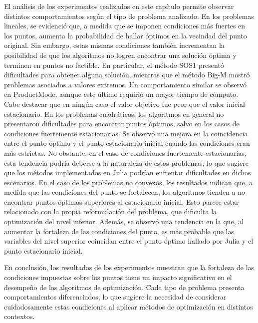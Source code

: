 El análisis de los experimentos realizados en este capítulo permite observar distintos comportamientos según el tipo de problema analizado.
En los problemas lineales, se evidenció que, a medida que se imponen condiciones más fuertes en los puntos, aumenta la probabilidad de hallar óptimos en la vecindad del punto original. 
Sin embargo, estas mismas condiciones también incrementan la posibilidad de que los algoritmos no logren encontrar una solución óptima y terminen en puntos no factible. 
En particular, el método SOS1 presentó dificultades para obtener alguna solución, mientras que el método Big-M mostró problemas asociados a valores extremos. 
Un comportamiento similar se observó en ProductMode, aunque este último requirió un mayor tiempo de cómputo. 
Cabe destacar que en ningún caso el valor objetivo fue peor que el valor inicial estacionario.  
En los problemas cuadráticos, los algoritmos en general no presentaron dificultades para encontrar puntos óptimos, salvo en los casos de condiciones fuertemente estacionarias. 
Se observó una mejora en la coincidencia entre el punto óptimo y el punto estacionario inicial cuando las condiciones eran más estrictas. 
No obstante, en el caso de condiciones fuertemente estacionarias, esta tendencia podría deberse a la naturaleza de estos problemas, 
lo que sugiere que los métodos implementados en Julia podrían enfrentar dificultades en dichos escenarios.  
En el caso de los problemas no convexos, los resultados indican que, a medida que las condiciones del punto se fortalecen, 
los algoritmos tienden a no encontrar puntos óptimos superiores al estacionario inicial. 
Esto parece estar relacionado con la propia reformulación del problema, 
que dificulta la optimización del nivel inferior. 
Además, se observó una tendencia en la que, al aumentar la fortaleza de las condiciones del punto, 
es más probable que las variables del nivel superior coincidan entre el punto óptimo hallado por Julia y 
el punto estacionario inicial.  

En conclusión, los resultados de los experimentos muestran que la fortaleza de las condiciones impuestas 
sobre los puntos tiene un impacto significativo en el desempeño de los algoritmos de optimización. 
Cada tipo de problema presenta comportamientos diferenciados, lo que sugiere la necesidad de considerar 
cuidadosamente estas condiciones al aplicar métodos de optimización en distintos contextos.
